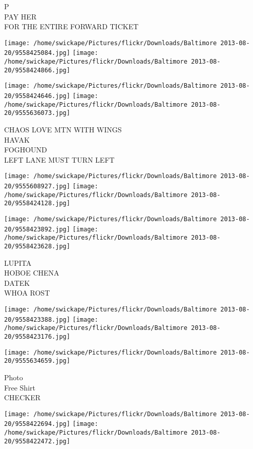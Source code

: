 \documentclass[10pt,letterpaper]{article}
\begin{document}
P\\
PAY HER\\
FOR THE ENTIRE FORWARD TICKET\\
\pagebreak

\texttt{[image: /home/swickape/Pictures/flickr/Downloads/Baltimore 2013-08-20/9558425084.jpg]}
\texttt{[image: /home/swickape/Pictures/flickr/Downloads/Baltimore 2013-08-20/9558424866.jpg]}

\texttt{[image: /home/swickape/Pictures/flickr/Downloads/Baltimore 2013-08-20/9558424646.jpg]}
\texttt{[image: /home/swickape/Pictures/flickr/Downloads/Baltimore 2013-08-20/9555636073.jpg]}

CHAOS LOVE MTN WITH WINGS\\
HAVAK\\
FOGHOUND\\
LEFT LANE MUST TURN LEFT\\
\pagebreak

\texttt{[image: /home/swickape/Pictures/flickr/Downloads/Baltimore 2013-08-20/9555608927.jpg]}
\texttt{[image: /home/swickape/Pictures/flickr/Downloads/Baltimore 2013-08-20/9558424128.jpg]}

\texttt{[image: /home/swickape/Pictures/flickr/Downloads/Baltimore 2013-08-20/9558423892.jpg]}
\texttt{[image: /home/swickape/Pictures/flickr/Downloads/Baltimore 2013-08-20/9558423628.jpg]}

LUPITA\\
HOBOE CHENA\\
DATEK\\
WHOA ROST\\
\pagebreak

\texttt{[image: /home/swickape/Pictures/flickr/Downloads/Baltimore 2013-08-20/9558423388.jpg]}
\texttt{[image: /home/swickape/Pictures/flickr/Downloads/Baltimore 2013-08-20/9558423176.jpg]}

\vspace{0.25in}
\texttt{[image: /home/swickape/Pictures/flickr/Downloads/Baltimore 2013-08-20/9555634659.jpg]}

Photo\\
Free Shirt\\
CHECKER\\
\pagebreak

\texttt{[image: /home/swickape/Pictures/flickr/Downloads/Baltimore 2013-08-20/9558422694.jpg]}
\texttt{[image: /home/swickape/Pictures/flickr/Downloads/Baltimore 2013-08-20/9558422472.jpg]}
\end{document}
